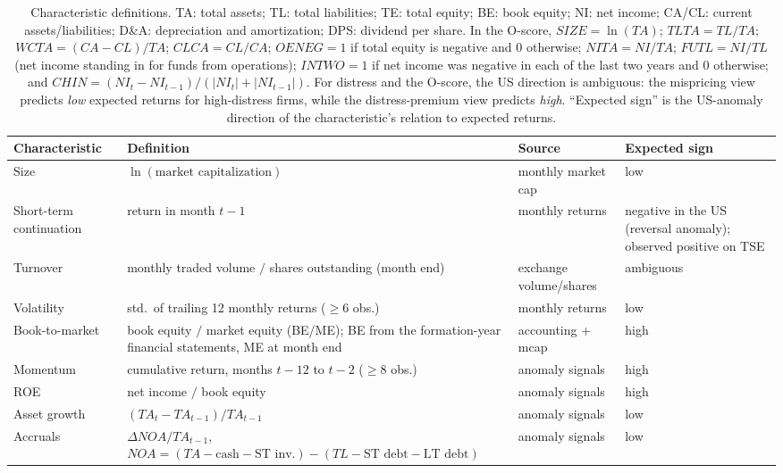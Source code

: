 \documentclass[12pt]{article}
\begin{document}
\begin{table}[htbp]
\centering
\scriptsize
\caption{Characteristic definitions. TA: total assets; TL: total liabilities; TE: total equity; BE: book equity; NI: net income; CA/CL: current assets/liabilities; D\&A: depreciation and amortization; DPS: dividend per share. In the O-score, $SIZE=\ln(TA)$; $TLTA=TL/TA$; $WCTA=(CA-CL)/TA$; $CLCA=CL/CA$; $OENEG=1$ if total equity is negative and 0 otherwise; $NITA=NI/TA$; $FUTL=NI/TL$ (net income standing in for funds from operations); $INTWO=1$ if net income was negative in each of the last two years and 0 otherwise; and $CHIN=(NI_t-NI_{t-1})/(|NI_t|+|NI_{t-1}|)$. For distress and the O-score, the US direction is ambiguous: the mispricing view predicts \emph{low} expected returns for high-distress firms, while the distress-premium view predicts \emph{high}. ``Expected sign'' is the US-anomaly direction of the characteristic's relation to expected returns.}
\label{tab:char_defs}
\begin{tabular}{@{}>{\raggedright\arraybackslash}p{3.5cm}>{\raggedright\arraybackslash}p{6.0cm}>{\raggedright\arraybackslash}p{2.2cm}>{\raggedright\arraybackslash}p{2.8cm}@{}}
\toprule
Characteristic & Definition & Source & Expected sign \\
\midrule
Size & $\ln(\text{market capitalization})$ & monthly market cap & low \\
Short-term continuation & return in month $t-1$ & monthly returns & negative in the US (reversal anomaly); observed positive on TSE \\
Turnover & monthly traded volume $/$ shares outstanding (month end) & exchange volume/shares & ambiguous \\
Volatility & std.\ of trailing 12 monthly returns ($\ge$6 obs.) & monthly returns & low \\
Book-to-market & book equity $/$ market equity (BE/ME); BE from the formation-year financial statements, ME at month end & accounting + mcap & high \\
Momentum & cumulative return, months $t{-}12$ to $t{-}2$ ($\ge$8 obs.) & anomaly signals & high \\
ROE & net income $/$ book equity & anomaly signals & high \\
Asset growth & $(TA_t - TA_{t-1})/TA_{t-1}$ & anomaly signals & low \\
Accruals & $\Delta NOA / TA_{t-1}$, $NOA = (TA - \text{cash} - \text{ST inv.}) - (TL - \text{ST debt} - \text{LT debt})$ & anomaly signals & low \\

\end{tabular}
\end{table}
\end{document}
